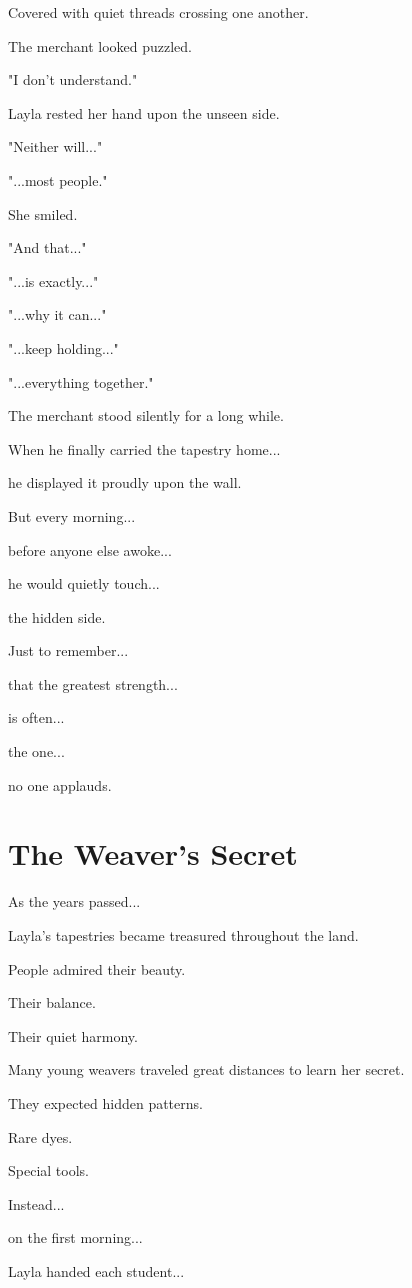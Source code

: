 \documentclass[12pt,openany]{book}
\begin{document}
Covered with quiet threads crossing one another.

The merchant looked puzzled.

"I don't understand."

Layla rested her hand upon the unseen side.

"Neither will..."

"...most people."

She smiled.

"And that..."

"...is exactly..."

"...why it can..."

"...keep holding..."

"...everything together."

The merchant stood silently for a long while.

When he finally carried the tapestry home...

he displayed it proudly upon the wall.

But every morning...

before anyone else awoke...

he would quietly touch...

the hidden side.

Just to remember...

that the greatest strength...

is often...

the one...

no one applauds.
\section*{The Weaver's Secret}

As the years passed...

Layla's tapestries became treasured throughout the land.

People admired their beauty.

Their balance.

Their quiet harmony.

Many young weavers traveled great distances to learn her secret.

They expected hidden patterns.

Rare dyes.

Special tools.

Instead...

on the first morning...

Layla handed each student...
\end{document}
